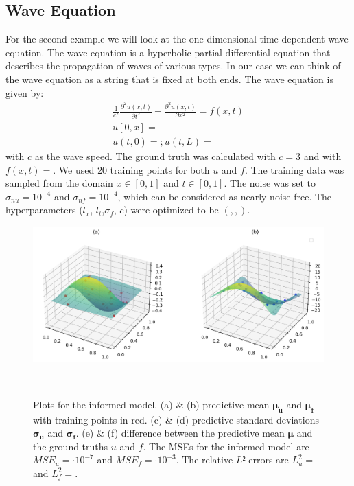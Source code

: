\documentclass{article}
\begin{document}
\subsection{Wave Equation}
For the second example we will look at the one dimensional time dependent wave equation. The wave equation is a hyperbolic partial differential equation that describes the propagation of waves of various types. In our case we can think of the wave equation as a string that is fixed at both ends. The wave equation is given by:
\begin{equation}
    \begin{aligned}
        \frac{1}{c^2} \frac{\partial^2 u(x,t)}{\partial t^2} - \frac{\partial^2 u(x,t)}{\partial x^2} = f(x,t) \\ u[0,x] =\\ u(t,0) = ; u(t,L) =
    \end{aligned}
\end{equation}
with $c$ as the wave speed. The ground truth was calculated with $c = 3$ and with $f(x,t) = $. We used 20 training points for both $u$ and $f$. The training data was sampled from the domain $x \in [0,1]$ and $t \in [0,1]$. The noise was set to $\sigma_{nu} = 10^{-4}$ and $\sigma_{nf} = 10^{-4}$, which can be considered as nearly noise free. The hyperparameters ($l_x$, $l_t$,$\sigma_f$, $c$) were optimized to be $(,,)$.
\begin{figure}
    \centering
    \includegraphics[width=1\textwidth]{../final_examples/wave_equation/predictive_mean.png}
    \caption{Plots for the informed model. (a) \& (b) predictive mean $\bm{\mu_u}$ and $\bm{\mu_f}$ with training points in red. (c) \& (d) predictive standard deviations $\bm{\sigma_u}$ and $\bm{\sigma_f}$. (e) \& (f) difference between the predictive mean $\bm{\mu}$ and the ground truths $u$ and $f$. The MSEs for the informed model are $MSE_u =  \cdot 10^{-7}$ and $MSE_f =  \cdot 10^{-3}$. The relative $L²$ errors are $L^2_u = $ and $L^2_f = $.}
    ~\label{fig:wave}
\end{figure}
\end{document}
